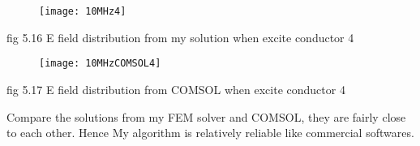 \documentclass[journal]{IEEEtran}
\begin{document}
\begin{figure}[h]
	\centering
	\texttt{[image: 10MHz4]}
\end{figure}
\begin{center}
	\small fig 5.16 E field distribution from my solution when excite conductor 4
\end{center} 
\begin{figure}[h]
	\centering
	\texttt{[image: 10MHzCOMSOL4]}
\end{figure}
\begin{center}
	\small fig 5.17 E field distribution from COMSOL when excite conductor 4
\end{center} 
Compare the solutions from my FEM solver and COMSOL, they are fairly close to each other. Hence My algorithm is relatively reliable like commercial softwares.
%
%

\end{document}
